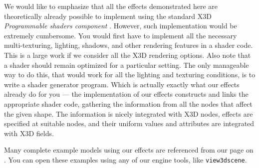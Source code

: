 \documentclass{egpubl}
\begin{document}
We would like to emphasize that all the effects demonstrated here
are theoretically already possible to implement using the standard
X3D \textit{Programmable shaders component} \cite{x3d:shaders}. However, such implementation
would be extremely cumbersome.
You would first have to implement all the necessary multi-texturing, lighting,
shadows, and other rendering features in a shader code.
This is a large work if we consider all the X3D rendering options.
Also note that a shader should remain optimized for a particular setting.
The only manageable way to do this, that would work for all the lighting
and texturing conditions, is to write a shader generator program.
Which is actually exactly what our effects already do for you ---
the implementation of our effects constructs and links
the appropriate shader code, gathering the information from all the nodes
that affect the given shape. The information is nicely integrated
with X3D nodes, effects are specified at suitable nodes, and their
uniform values and attributes are integrated with X3D fields.

Many complete example models using our effects
are referenced from our page on
.
You can open these examples using any of our engine tools,
like \texttt{view3dscene}.


\end{document}
